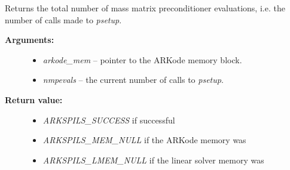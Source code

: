 \documentclass[letterpaper,10pt,english]{sphinxmanual}
\begin{document}
\begin{fulllineitems}
\label{c_interface/User_callable:c.ARKSpilsGetNumMassPrecEvals}
Returns the total number of mass matrix preconditioner evaluations,
i.e. the number of calls made to \emph{psetup}.
\begin{description}
\item[{\textbf{Arguments:}}] \leavevmode\begin{itemize}
\item {} 
\emph{arkode\_mem} -- pointer to the ARKode memory block.

\item {} 
\emph{nmpevals} -- the current number of calls to \emph{psetup}.

\end{itemize}

\item[{\textbf{Return value:}}] \leavevmode\begin{itemize}
\item {} 
\emph{ARKSPILS\_SUCCESS} if successful

\item {} 
\emph{ARKSPILS\_MEM\_NULL} if the ARKode memory was 

\item {} 
\emph{ARKSPILS\_LMEM\_NULL} if the linear solver memory was 

\end{itemize}

\end{description}

\end{fulllineitems}

\end{document}
